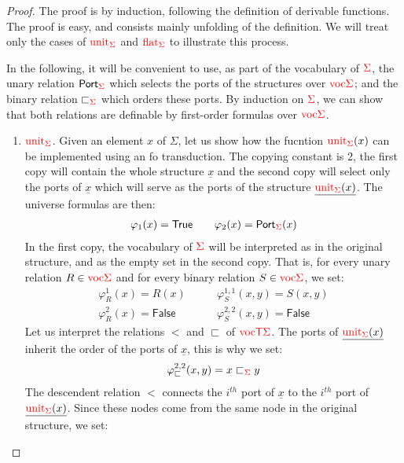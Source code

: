     \begin{proof}
    The proof is by induction, following the definition of derivable functions. The proof is easy, and consists mainly unfolding of the definition. We will treat only the cases of ${\color{red}{\mathrm{unit}}}_{\color{red}{\Sigma}}$ and ${\color{red}{\mathrm{flat}}}_{\color{red}{\Sigma}}$ to illustrate this process.
    
    In the following, it will be convenient to use, as part of the vocabulary of ${\color{red}{\Sigma}}$, the unary relation  $\mathsf{Port}_{\color{red}{\Sigma}}$ which selects the ports of the structures over ${\color{red}{\mathrm{voc}}}{\color{red}{\Sigma}}$; and the binary relation $\sqsubset_{\color{red}{\Sigma}}$ which orders these ports. By induction on ${\color{red}{\Sigma}}$, we can show that both relations are definable by first-order formulas over  ${\color{red}{\mathrm{voc}}}{\color{red}{\Sigma}}$.
    
    \begin{enumerate}
    \item ${\color{red}{\mathrm{unit}}}_{\color{red}{\Sigma}}$. Given an element $x$ of $\Sigma$, let us show how the fucntion ${\color{red}{\mathrm{unit}}}_{\color{red}{\Sigma}}(x)$ can be implemented using an fo transduction.  The copying constant is 2,
    the first copy will contain the whole structure $\underline{x}$ and the second copy will select only the ports of $\underline{x}$ which will serve as the ports of the structure $\underline{{\color{red}{\mathrm{unit}}}_{\color{red}{\Sigma}}(x)}$.  The universe formulas are then:
    \begin{align*}
    \varphi_1(x)=\mathsf{True} \qquad \varphi_2(x)=\mathsf{Port}_{\color{red}{\Sigma}}(x)
    \end{align*}
    In the first copy, the vocabulary of ${\color{red}{\Sigma}}$ will be interpreted as in the original structure, and as the empty set in the second copy. That is, for every unary relation $R\in {\color{red}{\mathrm{voc}}}{\color{red}{\Sigma}}$ and for every binary relation $S \in {\color{red}{\mathrm{voc}}}{\color{red}{\Sigma}}$, we set:
    \begin{align*}
   \varphi_R^{1}(x)=R(x) \quad&\quad \varphi_S^{1,1}(x,y)=S(x,y)\\
   \varphi_R^{2}(x)=\mathsf{False} \quad&\quad \varphi_S^{2,2}(x,y)=\mathsf{False}
\end{align*}      
Let us interpret the relations $<$ and $\sqsubset$ of ${\color{red}{\mathrm{voc}}}{\color{red}{\mathsf T}}{\color{red}{\Sigma}}$. The  ports of $\underline{{\color{red}{\mathrm{unit}}}_{\color{red}{\Sigma}}(x)}$ inherit the order of the ports of $\underline{x}$, this is why we set:
\begin{align*}
\varphi_\sqsubset^{2,2}(x,y)=x\sqsubset_{\color{red}{\Sigma}} y
\end{align*}
The descendent relation $<$ connects the $i^{th}$ port of $\underline{x}$ to the $i^{th}$ port of $\underline{{\color{red}{\mathrm{unit}}}_{\color{red}{\Sigma}}(x)}$. Since these nodes come from the same node in the original structure, we set:

\end{enumerate}
\end{proof}
